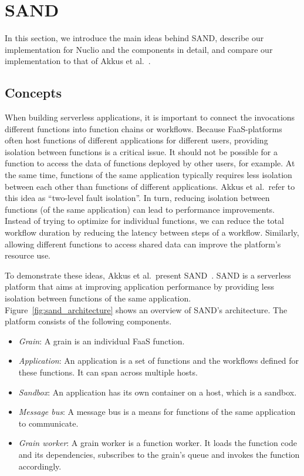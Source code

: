 \section{SAND}

In this section, we introduce the main ideas behind SAND, describe our implementation for Nuclio and the components in detail, and compare our implementation to that of Akkus et al.~\cite{akkus2018sand}.

\subsection{Concepts}

When building serverless applications, it is important to connect the invocations different functions into function chains or workflows.
Because FaaS-platforms often host functions of different applications for different users, providing isolation between functions is a critical issue.
It should not be possible for a function to access the data of functions deployed by other users, for example.
At the same time, functions of the same application typically requires less isolation between each other than functions of different applications.
Akkus et al.~refer to this idea as \enquote{two-level fault isolation}.
In turn, reducing isolation between functions (of the same application) can lead to performance improvements.
Instead of trying to optimize for individual functions, we can reduce the total workflow duration by reducing the latency between steps of a workflow.
Similarly, allowing different functions to access shared data can improve the platform's resource use. 

To demonstrate these ideas, Akkus et al.~present SAND~\cite{akkus2018sand}.
SAND is a serverless platform that aims at improving application performance by providing less isolation between functions of the same application.
Figure~\ref{fig:sand_architecture} shows an overview of SAND's architecture.
The platform consists of the following components.
\begin{itemize}
    \item \emph{Grain}: A grain is an individual FaaS function.
    \item \emph{Application}: An application is a set of functions and the workflows defined for these functions. It can span across multiple hosts.
    \item \emph{Sandbox}: An application has its own container on a host, which is a sandbox. 
    \item \emph{Message bus}: A message bus is a means for functions of the same application to communicate. 
    \item \emph{Grain worker}: A grain worker is a function worker. It loads the function code and its dependencies, subscribes to the grain's queue and invokes the function accordingly.
\end{itemize}

